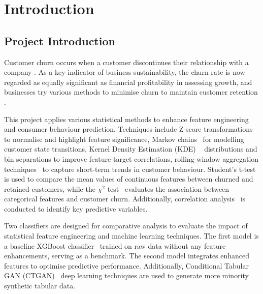 \documentclass[journal=gmj]{CUP-JNL-DTM}%
\theoremstyle{definition}
\numberwithin{equation}{section}
\begin{document}
\section{Introduction}
\subsection{Project Introduction}
Customer churn occurs when a customer discontinues their relationship with a company \cite{8538420}. As a key indicator of business sustainability, the churn rate is now regarded as equally significant as financial profitability in assessing growth, and businesses try various methods to minimise churn to maintain customer retention \cite{Khan_2015}.

This project applies various statistical methods to enhance feature engineering and consumer behaviour prediction. Techniques include Z-score transformations~\cite{Nadarajah01092005} to normalise and highlight feature significance, Markov chains~\cite{inproceedings} for modelling customer state transitions, Kernel Density Estimation (KDE) ~\cite{KDE} distributions and bin separations to improve feature-target correlations, rolling-window aggregation techniques~\cite{Tangwongsan2018} to capture short-term trends in customer behaviour. Student’s t-test~\cite{student1908probable} is used to compare the mean values of continuous features between churned and retained customers, while the $\chi^2$ test~\cite{Pearson1900} evaluates the association between categorical features and customer churn. Additionally, correlation analysis~\cite{correlation} is conducted to identify key predictive variables. 

Two classifiers are designed for comparative analysis to evaluate the impact of statistical feature engineering and machine learning techniques. The first model is a baseline XGBoost classifier~\cite{Chen_2016} trained on raw data without any feature enhancements, serving as a benchmark. The second model integrates enhanced features to optimise predictive performance. Additionally, Conditional Tabular GAN (CTGAN)~\cite{ctgan} deep learning techniques are used to generate more minority synthetic tabular data.
\end{document}

